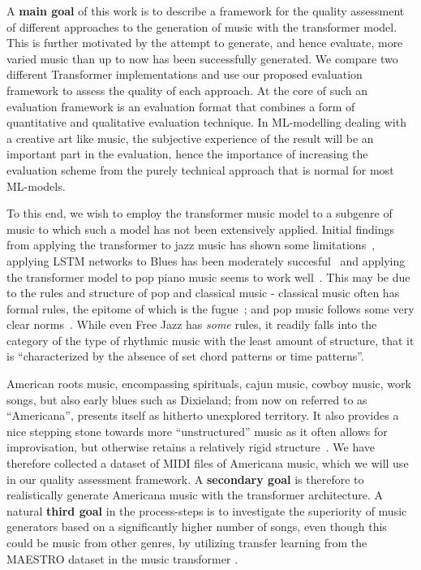 \documentclass{IEEEtran}
\begin{document}
A \textbf{main goal} of this work is to describe a framework for the quality assessment of different
approaches to the generation of music with the transformer model. This is further
motivated by the attempt to generate, and hence evaluate, more varied music than 
up to now has been successfully generated. We compare
two different Transformer implementations and use our proposed evaluation
framework to assess the quality of each approach. At the core of such an evaluation framework is an evaluation format that combines a form of quantitative and qualitative evaluation technique. 
In ML-modelling dealing with a creative art like music, the subjective 
experience of the result will be an important part in the evaluation, hence the importance of increasing 
the evaluation scheme from the purely technical approach that is normal for most 
ML-models.

To this end, we wish to employ the transformer music model to a subgenre of music
to which such a model has not been extensively applied. Initial findings from
applying the transformer to jazz music has shown some
limitations~\cite{wu2020jazz}, applying LSTM networks to Blues has been
moderately succesful~\cite{eck2002bluesLSTM} and applying the transformer
model to pop piano music seems to work well~\cite{huang2020pop}. This may be due 
to the rules and structure of pop and classical music - classical music often 
has formal rules, the epitome of which is the fugue~\cite{giraud2015computational}; and
pop music follows some very clear norms~\cite{hennion1983production}. While
even Free Jazz has \emph{some} rules, it readily falls into the category of
the type of rhythmic music with the least amount of structure, that it is ``characterized by the absence of set chord patterns or
time patterns''\cite{FreeJazz}.

American roots music, encompassing spirituals, cajun music, cowboy music,
work songs, but also early blues such as Dixieland; from now on referred to
as ``Americana'', presents itself as hitherto unexplored territory. It also
provides a nice stepping stone towards more ``unstructured'' music as it
often allows for improvisation, but otherwise retains a relatively rigid
structure~\cite{libcong}. We have therefore collected a dataset of MIDI files
of Americana music, which we will use in our quality assessment framework.
A \textbf{secondary goal} is therefore to realistically generate Americana music with the 
transformer
architecture. A natural \textbf{third goal} in the process-steps is to investigate the
superiority of music generators based on a significantly higher number of
songs, even though this could be music from other genres, by utilizing
transfer learning from the MAESTRO dataset in the music transformer
\cite{huang2018music}.
\end{document}
